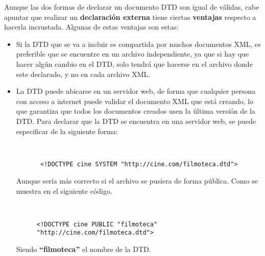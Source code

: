 Aunque las dos formas de declarar un documento DTD son igual de válidas, cabe apuntar que realizar un \textbf{declaración externa} tiene ciertas \textbf{ventajas} respecto a hacerla incrustada. Algunas de estas ventajas son estas:

\begin{itemize}
    \item Si la DTD que se va a incluir es compartida por muchos documentos XML, es preferible que se encuentre en un archivo independiente, ya que si hay que hacer algún cambio en el DTD, solo tendrá que hacerse en el archivo donde este declarado, y no en cada archivo XML.

    \item La DTD puede ubicarse en un servidor web, de forma que cualquier persona con acceso a internet puede validar el documento XML que está creando, lo que garantiza que todos los documentos creados usen la última versión de la DTD. Para declarar que la DTD se encuentra en una servidor web, se puede especificar de la siguiente forma:

    \begin{figure}[H]
        \begin{tcolorbox}[sharp corners, colback=yellow!30, colframe=white!20]
            \scriptsize
            \begin{verbatim}


 <!DOCTYPE cine SYSTEM "http://cine.com/filmoteca.dtd">
            \end{verbatim}
        \end{tcolorbox}
    \end{figure}

    Aunque sería más correcto si el archivo se pusiera de forma pública. Como se muestra en el siguiente código.

    \begin{figure}[h]
        \begin{tcolorbox}[sharp corners, colback=yellow!30, colframe=white!20]
            \scriptsize
            \begin{verbatim}


<!DOCTYPE cine PUBLIC "filmoteca" "http://cine.com/filmoteca.dtd">
            \end{verbatim}
        \end{tcolorbox}
    \end{figure}

    Siendo \textbf{``filmoteca''} el nombre de la DTD.
\end{itemize}


